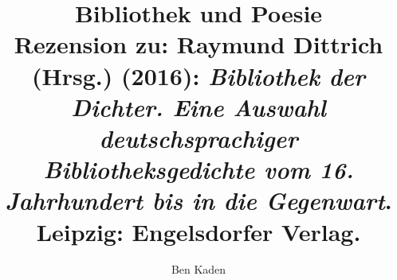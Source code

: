 
\fancyhead[R]{\thepage} %

\title{\LARGE{Bibliothek und Poesie} \\ Rezension zu: Raymund Dittrich (Hrsg.) (2016): \emph{Bibliothek der Dichter. Eine Auswahl deutschsprachiger Bibliotheksgedichte vom 16. Jahrhundert bis in die Gegenwart}. Leipzig: Engelsdorfer Verlag.
} %
\author{Ben Kaden} %

\setcounter{page}{182}